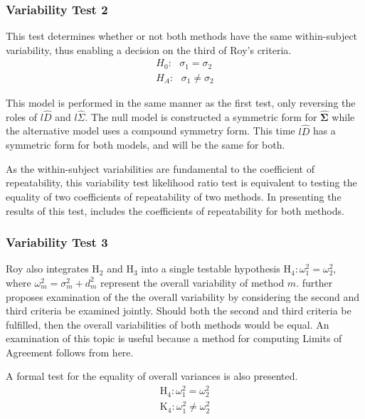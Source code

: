 \documentclass[12pt, a4paper]{report}
\theoremstyle{plain}
\theoremstyle{definition}
\theoremstyle{remark}
\begin{document}
	\subsubsection{Variability Test 2}
	
	This test determines whether or not both methods have the same within-subject variability, thus enabling a decision on the third of Roy's criteria.
	\begin{eqnarray*}
		H_{0}: \mbox{ }\sigma_{1}  = \sigma_{2} \\
		H_{A}: \mbox{ }\sigma_{1}  \neq \sigma_{2}
	\end{eqnarray*}
	
	This model is performed in the same manner as the first test, only reversing the roles of $l{\hat{D}}$ and $l{\hat{\Sigma}}$. The null model is constructed a symmetric form for $\boldsymbol{\hat{\Sigma}}$ while the alternative model uses a compound symmetry form. This time $l{\hat{D}}$ has a symmetric form for both models, and will be the same for both.
	
	As the within-subject variabilities are fundamental to the coefficient of repeatability, this variability test likelihood ratio test is equivalent to testing the equality of two coefficients of repeatability of two methods. In presenting the results of this test, \citet{ARoy2009} includes the coefficients of repeatability for both methods.
	
	
	\subsubsection{Variability Test 3}
	Roy also integrates $\mathrm{H}_2$ and $\mathrm{H}_3$ into a single testable hypothesis $\mathrm{H}_4\colon \omega^2_1=\omega^2_2,$ where $\omega^2_m = \sigma^2_m + d^2_m$ represent the overall variability of method $m.$ \citet{ARoy2009} further proposes examination of the the overall variability by considering the second and third criteria be examined jointly. Should both the second and third criteria be fulfilled, then the overall variabilities of both methods would be equal. An examination of this topic is useful because a method for computing Limits of Agreement follows from here.
	
A formal test for the equality of overall variances is also presented.
\begin{eqnarray*}
	\operatorname{H_4} : \omega^2_1 = \omega^2_2 \\
	\operatorname{K_4} : \omega^2_1 \neq \omega^2_2
\end{eqnarray*}
\end{document}

